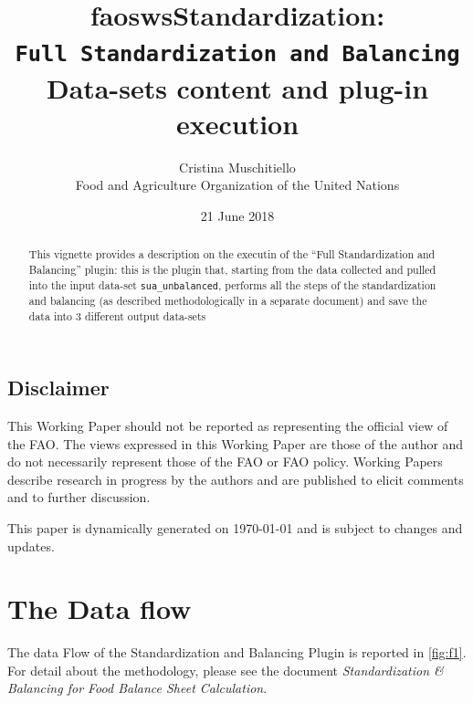 \documentclass[]{article}
\title{faoswsStandardization:\\
\texttt{Full\ Standardization\ and\ Balancing}\\
Data-sets content and plug-in execution}
\author{Cristina Muschitiello\\
Food and Agriculture Organization of the United Nations}
\date{21 June 2018}
\begin{document}
\maketitle
\begin{abstract}
This vignette provides a description on the executin of the ``Full
Standardization and Balancing'' plugin: this is the plugin that,
starting from the data collected and pulled into the input data-set
\texttt{sua\_unbalanced}, performs all the steps of the standardization
and balancing (as described methodologically in a separate document) and
save the data into 3 different output data-sets
\end{abstract}

{
\setcounter{tocdepth}{4}
\tableofcontents
}
\listoffigures

\subsection*{Disclaimer}\label{disclaimer}

This Working Paper should not be reported as representing the official
view of the FAO. The views expressed in this Working Paper are those of
the author and do not necessarily represent those of the FAO or FAO
policy. Working Papers describe research in progress by the authors and
are published to elicit comments and to further discussion.

This paper is dynamically generated on \today{} and is subject to
changes and updates.

\newpage

\section*{The Data flow}\label{the-data-flow}

The data Flow of the Standardization and Balancing Plugin is reported in
\ref{fig:f1}. For detail about the methodology, please see the document
\emph{Standardization \& Balancing for Food Balance Sheet Calculation}.
\end{document}
